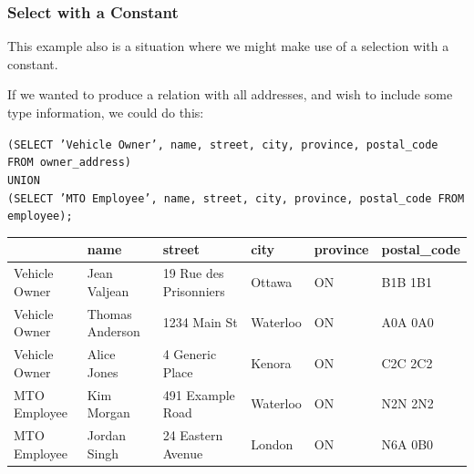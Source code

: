 \begin{frame}
\frametitle{Select with a Constant}

This example also is a situation where we might make use of a selection with a constant. 

If we wanted to produce a relation with all addresses, and wish to include some type information, we could do this:

\texttt{(SELECT 'Vehicle Owner', name, street, city, province, postal\_code FROM owner\_address)\\
UNION\\
(SELECT 'MTO Employee', name, street, city, province, postal\_code FROM employee);}

{\scriptsize
\begin{center}
	\begin{tabular}{|l|l|l|l|l|l|}\hline
		\textbf{} & \textbf{name} &\textbf{street} & \textbf{city} & \textbf{province} & \textbf{postal\_code} \\ \hline
		Vehicle Owner & Jean Valjean & 19 Rue des Prisonniers & Ottawa & ON & B1B 1B1\\ \hline
		Vehicle Owner & Thomas Anderson & 1234 Main St & Waterloo & ON & A0A 0A0\\ \hline
		Vehicle Owner & Alice Jones & 4 Generic Place & Kenora & ON & C2C 2C2\\ \hline
		MTO Employee & Kim Morgan & 491 Example Road & Waterloo & ON & N2N 2N2\\ \hline
		MTO Employee & Jordan Singh & 24 Eastern Avenue & London & ON & N6A 0B0\\ \hline
	\end{tabular}
\end{center}
}


\end{frame}








